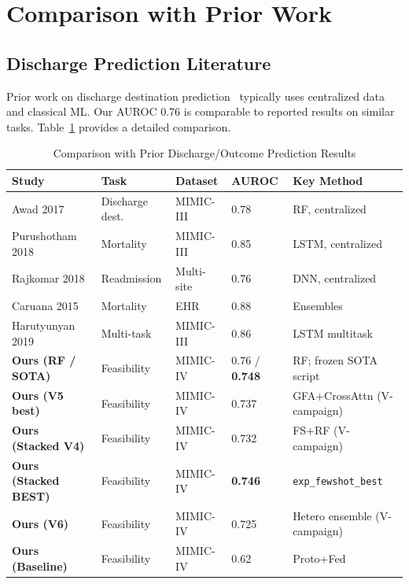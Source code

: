 \section{Comparison with Prior Work}

\subsection{Discharge Prediction Literature}

Prior work on discharge destination prediction~\cite{awad2017random,caruana2015intelligible} typically uses centralized data and classical ML. Our AUROC 0.76 is comparable to reported results on similar tasks. Table~\ref{tab:discharge_comparison} provides a detailed comparison.

\begin{table}[htbp]
\centering
\caption{Comparison with Prior Discharge/Outcome Prediction Results}
\small
\begin{tabular}{p{2.5cm}p{1.5cm}p{1.5cm}p{1.5cm}p{2.5cm}}
\toprule
\textbf{Study} & \textbf{Task} & \textbf{Dataset} & \textbf{AUROC} & \textbf{Key Method} \\
\midrule
Awad 2017 & Discharge dest. & MIMIC-III & 0.78 & RF, centralized \\
Purushotham 2018 & Mortality & MIMIC-III & 0.85 & LSTM, centralized \\
Rajkomar 2018 & Readmission & Multi-site & 0.76 & DNN, centralized \\
Caruana 2015 & Mortality & EHR & 0.88 & Ensembles \\
Harutyunyan 2019 & Multi-task & MIMIC-III & 0.86 & LSTM multitask \\
\textbf{Ours (RF / SOTA)} & Feasibility & MIMIC-IV & 0.76 / \textbf{0.748} & RF; frozen SOTA script \\
\textbf{Ours (V5 best)} & Feasibility & MIMIC-IV & 0.737 & GFA+CrossAttn (V-campaign) \\
\textbf{Ours (Stacked V4)} & Feasibility & MIMIC-IV & 0.732 & FS+RF (V-campaign) \\
\textbf{Ours (Stacked BEST)} & Feasibility & MIMIC-IV & \textbf{0.746} & \texttt{exp\_fewshot\_best} \\
\textbf{Ours (V6)} & Feasibility & MIMIC-IV & 0.725 & Hetero ensemble (V-campaign) \\
\textbf{Ours (Baseline)} & Feasibility & MIMIC-IV & 0.62 & Proto+Fed \\
\bottomrule
\end{tabular}
\label{tab:discharge_comparison}
\end{table}


